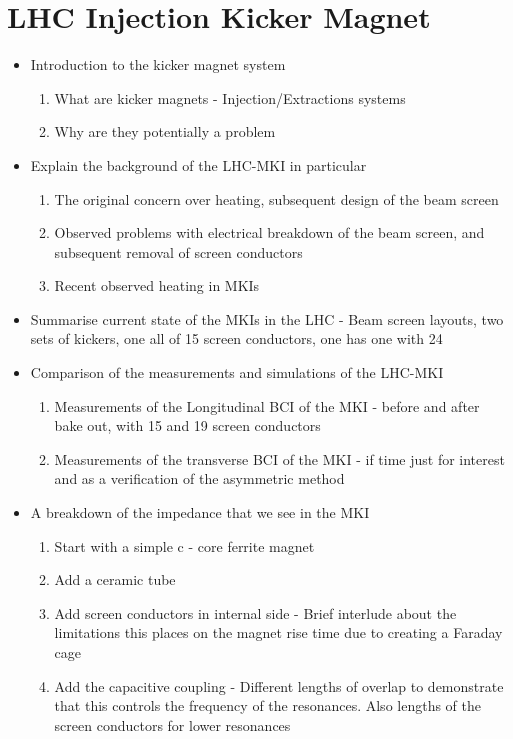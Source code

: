 
\section{LHC Injection Kicker Magnet}

\begin{itemize}
\item{Introduction to the kicker magnet system}
\begin{enumerate}
\item{What are kicker magnets - Injection/Extractions systems}
\item{Why are they potentially a problem}
\end{enumerate}
\item{Explain the background of the LHC-MKI in particular}
\begin{enumerate}
\item{The original concern over heating, subsequent design of the beam screen}
\item{Observed problems with electrical breakdown of the beam screen, and subsequent removal of screen conductors}
\item{Recent observed heating in MKIs}
\end{enumerate}
\item{Summarise current state of the MKIs in the LHC - Beam screen layouts, two sets of kickers, one all of 15 screen conductors, one has one with 24}
\item{Comparison of the measurements and simulations of the LHC-MKI}
\begin{enumerate}
\item{Measurements of the Longitudinal BCI of the MKI - before and after bake out, with 15 and 19 screen conductors}
\item{Measurements of the transverse BCI of the MKI - if time just for interest and as a verification of the asymmetric method}
\end{enumerate}
\item{A breakdown of the impedance that we see in the MKI}
\begin{enumerate}
\item{Start with a simple c - core ferrite magnet}
\item{Add a ceramic tube}
\item{Add screen conductors in internal side - Brief interlude about the limitations this places on the magnet rise time due to creating a Faraday cage}
\item{Add the capacitive coupling - Different lengths of overlap to demonstrate that this controls the frequency of the resonances. Also lengths of the screen conductors for lower resonances}

\end{enumerate}
\end{itemize}
